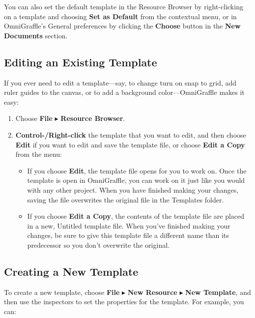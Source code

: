 \documentclass[../main.tex]{subfiles}
\begin{document}
\begin{ogtip}
  You can also set the default template in the Resource Browser by right-clicking on a template
  and choosing \textbf{Set as Default} from the contextual menu, or in OmniGraffle's General
  preferences by clicking the \textbf{Choose} button in the \textbf{New Documents} section.
\end{ogtip}

\subsection{Editing an Existing Template}

If you ever need to edit a template---say, to change turn on snap to grid, add ruler guides to
the canvas, or to add a background color---OmniGraffle makes it easy:

\begin{enumerate}
  \item Choose \textbf{File} $\blacktriangleright$ \textbf{Resource Browser}.
  \item \textbf{Control-/Right-click} the template that you want to edit, and then choose
    \textbf{Edit} if you want to edit and save the template file, or choose \textbf{Edit a Copy}
    from the menu:


    \begin{itemize}
      \item If you choose \textbf{Edit}, the template file opens for you to work on. Once the
        template is open in OmniGraffle, you can work on it just like you would with any other
        project. When you have finished making your changes, saving the file overwrites the
        original file in the Templates folder.
      \item If you choose \textbf{Edit a Copy}, the contents of the template file are placed in a
        new, Untitled template file. When you've finished making your changes, be sure to give
        this template file a different name than its predecessor so you don't overwrite the
        original.
    \end{itemize}
\end{enumerate}

\subsection{Creating a New Template}

To create a new template, choose \textbf{File} $\blacktriangleright$ \textbf{New Resource}
$\blacktriangleright$ \textbf{New Template}, and then use the inspectors to set the properties
for the template. For example, you can:
\end{document}
